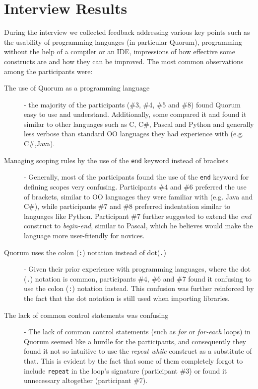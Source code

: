 \section{Interview Results}
During the interview we collected feedback addressing various key points such as the usability of programming languages (in particular Quorum), programming without the help of a compiler or an IDE, impressions of how effective some constructs are and how they can be improved. The most common observations among the participants were:

\begin{description}
\item[The use of Quorum as a programming language] - the majority of the participants (\#3, \#4, \#5 and \#8) found Quorum easy to use and understand. Additionally, some compared it and found it similar to other languages such as C, C\#, Pascal and Python and generally less verbose than standard OO languages they had experience with (e.g. C\#,Java). 
\item[Managing scoping rules by the use of the \texttt{end} keyword instead of brackets] - Generally, most of the participants found the use of the \lstinline!end! keyword for defining scopes very confusing. Participants \#4 and \#6 preferred the use of brackets, similar to OO languages they were familiar with (e.g. Java and C\#), while participants \#7 and \#8 preferred indentation similar to languages like Python. Participant \#7 further suggested to extend the \textit{end} construct to \textit{begin-end}, similar to Pascal, which he believes would make the language more user-friendly for novices. 
\item[Quorum uses the colon (\texttt{:}) notation instead of dot(\texttt{.})] - Given their prior experience with programming languages, where the dot (\lstinline!.!) notation is common, participants \#4, \#6 and \#7 found it confusing to use the colon (\lstinline!:!) notation instead. This confusion was further reinforced by the fact that the dot notation is still used when importing libraries.
\item[The lack of common control statements was confusing] - The lack of common control statements (such as \textit{for} or \textit{for-each} loops) in Quorum seemed like a hurdle for the participants, and consequently they found it not so intuitive to use the \textit{repeat while} construct as a substitute of that. This is evident by the fact that some of them completely forgot to include \lstinline!repeat! in the loop's signature (participant \#3) or found it unnecessary altogether (participant \#7).
\end{description}

